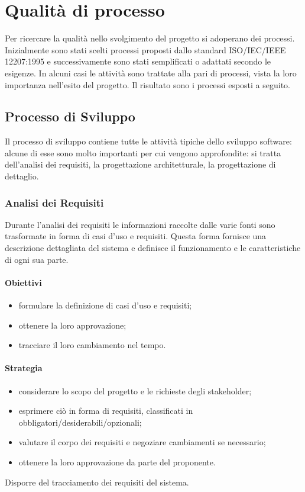 \section{Qualità di processo}
Per ricercare la qualità nello svolgimento del progetto si adoperano dei processi. Inizialmente sono stati scelti processi proposti dallo standard ISO/IEC/IEEE 12207:1995 e successivamente sono stati semplificati o adattati secondo le esigenze.
In alcuni casi le attività sono trattate alla pari di processi, vista la loro importanza nell'esito del progetto.
Il risultato sono i processi esposti a seguito.


	\subsection{Processo di Sviluppo}
	Il processo di sviluppo contiene tutte le attività tipiche dello sviluppo software: alcune di esse sono molto importanti per cui vengono approfondite: si tratta dell'analisi dei requisiti, la progettazione architetturale, la progettazione di dettaglio.
	\subsubsection{Analisi dei Requisiti}
	Durante l'analisi dei requisiti le informazioni raccolte dalle varie fonti sono trasformate in forma di casi d'uso e requisiti.
	Questa forma fornisce una descrizione dettagliata del sistema e definisce il funzionamento e le caratteristiche di ogni sua parte.
		\paragraph{Obiettivi}
		\begin{itemize}
			\item formulare la definizione di casi d'uso e requisiti;
			\item ottenere la loro approvazione;
			\item tracciare il loro cambiamento nel tempo.
		\end{itemize}		
		\paragraph{Strategia}
		\begin{itemize}
			\item considerare lo scopo del progetto e le richieste degli stakeholder;
			\item esprimere ciò in forma di requisiti, classificati in obbligatori/desiderabili/opzionali;
			\item valutare il corpo dei requisiti e negoziare cambiamenti se necessario;
			\item ottenere la loro approvazione da parte del proponente.
		\end{itemize}
		Disporre del tracciamento dei requisiti del sistema.
